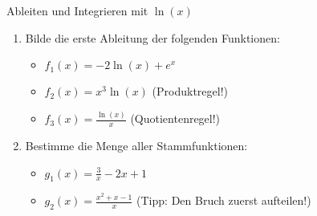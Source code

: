 \begin{aufgabenumgebung}{Ableiten und Integrieren mit \texorpdfstring{$\ln(x)$}{ln(x)}}
\begin{enumerate}
    \item Bilde die erste Ableitung der folgenden Funktionen:
        \begin{itemize}
            \item $f_1(x) = -2\ln(x) + e^x$
            \item $f_2(x) = x^3 \ln(x)$ (Produktregel!)
            \item $f_3(x) = \frac{\ln(x)}{x}$ (Quotientenregel!)
        \end{itemize}
    \item Bestimme die Menge aller Stammfunktionen:
        \begin{itemize}
            \item $g_1(x) = \frac{3}{x} - 2x + 1$
            \item $g_2(x) = \frac{x^2+x-1}{x}$ (Tipp: Den Bruch zuerst aufteilen!)
        \end{itemize}
\end{enumerate}
\end{aufgabenumgebung}



